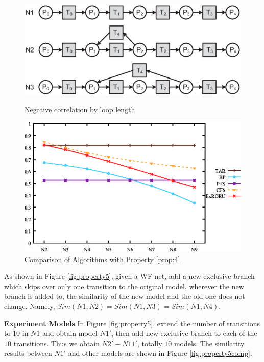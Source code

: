 \documentclass{llncs}
\begin{document}
\begin{figure}[ht]
\centering
\begin{minipage}[t]{0.45\textwidth}
	\centering
	\includegraphics[width=1\textwidth]{fig_property_4.eps}
	\caption{Negative correlation by loop length}
	\label{fig:property4}
\end{minipage}
\hspace{0.1in}
\begin{minipage}[t]{0.45\textwidth}
	\centering
	\includegraphics[width=1\textwidth]{fig_property_4_comp.eps}
	\caption{Comparison of Algorithms with Property \ref{prop:4}}
	\label{fig:property4comp}
\end{minipage}
\end{figure}

\begin{property}\label{prop:5}
As shown in Figure \ref{fig:property5}, given a WF-net, add a new exclusive branch which skips over only one transition to the original model, wherever the new branch is added to, the similarity of the new model and the old one does not change. Namely, $Sim(N1,N2)=Sim(N1,N3)=Sim(N1,N4)$.
\end{property}
\textbf{Experiment Models} In Figure \ref{fig:property5}, extend the number of transitions to $10$ in $N1$ and obtain model $N1'$, then add new exclusive branch to each of the $10$ transitions. Thus we obtain $N2'-N11'$, totally $10$ models. The similarity results between $N1'$ and other models are shown in Figure \ref{fig:property5comp}.
\end{document}
